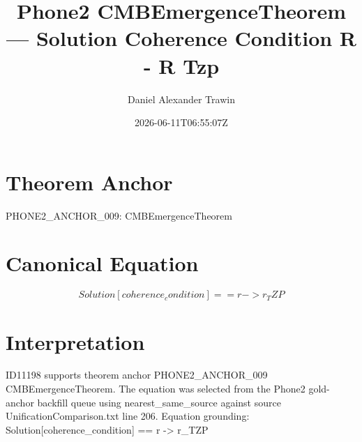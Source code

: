 \documentclass[11pt]{article}
\title{Phone2 CMBEmergenceTheorem — Solution Coherence Condition R - R Tzp}
\author{Daniel Alexander Trawin}
\date{2026-06-11T06:55:07Z}
\begin{document}
\maketitle
\section*{Theorem Anchor}
PHONE2_ANCHOR_009: CMBEmergenceTheorem
\section*{Canonical Equation}
\[
Solution[coherence_condition] == {r -> r_TZP}
\]
\section*{Interpretation}
ID11198 supports theorem anchor PHONE2_ANCHOR_009 CMBEmergenceTheorem. The equation was selected from the Phone2 gold-anchor backfill queue using nearest_same_source against source UnificationComparison.txt line 206. Equation grounding: Solution[coherence_condition] == {r -> r_TZP}
\end{document}

